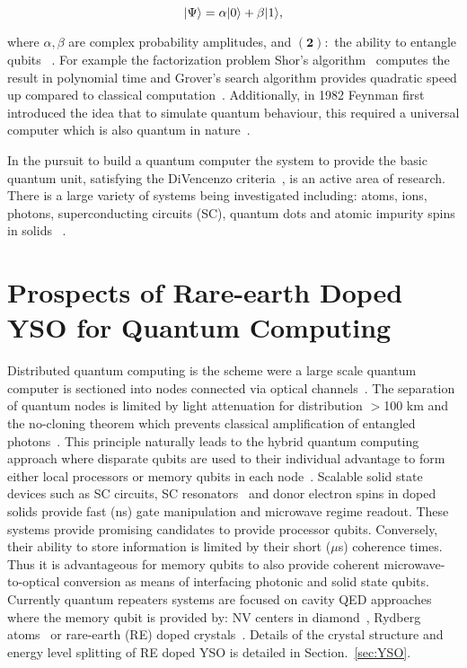 \begin{equation}
\label{eq:qubit}
\lvert\Psi\rangle = \alpha \lvert0\rangle + \beta \lvert1\rangle,  
\end{equation} 

\noindent where $\alpha, \beta$ are complex probability amplitudes, and $\bm{(2)}:$ the ability to entangle qubits ~\citep{Nielsen2010QuantumInformation}. For example the factorization problem Shor's algorithm~\citep{doi:10.1137/S0097539795293172} computes the result in polynomial time and Grover's search algorithm provides quadratic speed up compared to classical computation~\citep{Grover:1996:FQM:237814.237866}. Additionally, in 1982 Feynman first introduced the idea that to simulate quantum behaviour, this required a universal computer which is also quantum in nature~\citep{Feynman1982}. 

In the pursuit to build a quantum computer the system to provide the basic quantum unit, satisfying the DiVencenzo criteria~\citep{Divincenzo2000TheComputation}, is an active area of research. There is a large variety of systems being investigated including: atoms, ions, photons, superconducting circuits (SC), quantum dots and atomic impurity spins in solids ~\citep{0034-4885-74-10-104401,10.1038/nature07129,MORTON2018128}.   
  


\section{Prospects of Rare-earth Doped YSO for Quantum Computing}
Distributed quantum computing is the scheme were a large scale quantum computer is sectioned into nodes connected via optical channels~\citep{DiVincenzo255}. The separation of quantum nodes is limited by light attenuation for distribution $>$100 km and the no-cloning theorem which prevents classical amplification of entangled photons~\citep{Duan2001Long-distanceOptics}. This principle naturally leads to the hybrid quantum computing approach where disparate qubits are used to their individual advantage to form either local processors or memory qubits in each node~\citep{nature07127}. Scalable solid state devices such as SC circuits, SC resonators~\citep{Houck2009} and donor electron spins in doped solids \citep{doi:10.1146/annurev-conmatphys-062910-140514} provide fast (ns) gate manipulation and microwave regime readout. These systems provide promising candidates to provide processor qubits. Conversely, their ability to store information is limited by their short ($\mu$s) coherence times. Thus it is advantageous for memory qubits to also provide coherent microwave-to-optical conversion as means of interfacing photonic and solid state qubits. Currently quantum repeaters systems are focused on cavity QED approaches where the memory qubit is provided by: NV centers in diamond~\citep{PhysRevA.92.020301}, Rydberg atoms~\citep{PhysRevA.96.013833} or rare-earth (RE) doped crystals~\citep{PhysRevB.84.060501}. Details of the crystal structure and energy level splitting of RE doped YSO is detailed in Section.~\ref{sec:YSO}.  

